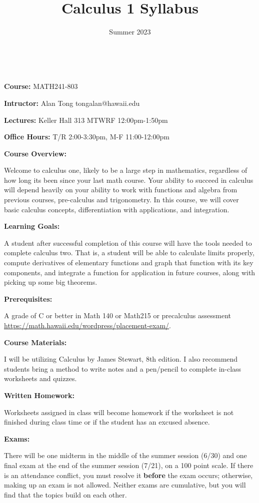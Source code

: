 \documentclass{article}
\title{Calculus 1 Syllabus}
\author{Summer 2023}
\date{\ }
\begin{document}
\maketitle

\textbf{Course: } MATH241-803

\textbf{Intructor: }Alan Tong \quad tongalan@hawaii.edu

\textbf{Lectures: }Keller Hall 313 \quad MTWRF 12:00pm-1:50pm

\textbf{Office Hours: }T/R 2:00-3:30pm, M-F 11:00-12:00pm

\textbf{Course Overview: }

Welcome to calculus one, likely to be a large step in mathematics, regardless of how long its been since your last math course. Your ability to succeed in calculus will depend heavily on your ability to work with functions and algebra from previous courses, pre-calculus and trigonometry. In this course, we will cover basic calculus concepts, differentiation with applications, and integration.

\textbf{Learning Goals: }

A student after successful completion of this course will have the tools needed to complete calculus two. That is, a student will be able to calculate limits properly, compute derivatives of elementary functions and graph that function with its key components, and integrate a function for application in future courses, along with picking up some big theorems.

\textbf{Prerequisites: }

A grade of C or better in Math 140 or Math215 or precalculus assessment \url{https://math.hawaii.edu/wordpress/placement-exam/}.

\textbf{Course Materials: }

I will be utilizing Calculus by James Stewart, 8th edition. I also recommend students bring a method to write notes and a pen/pencil to complete in-class worksheets and quizzes. 

\textbf{Written Homework: }

Worksheets assigned in class will become homework if the worksheet is not finished during class time or if the student has an excused absence.

\textbf{Exams: }

There will be one midterm in the middle of the summer session (6/30) and one final exam at the end of the summer session (7/21), on a 100 point scale. If there is an attendance conflict, you must resolve it \textbf{before} the exam occurs; otherwise, making up an exam is not allowed. Neither exams are cumulative, but you will find that the topics build on each other.
\end{document}
